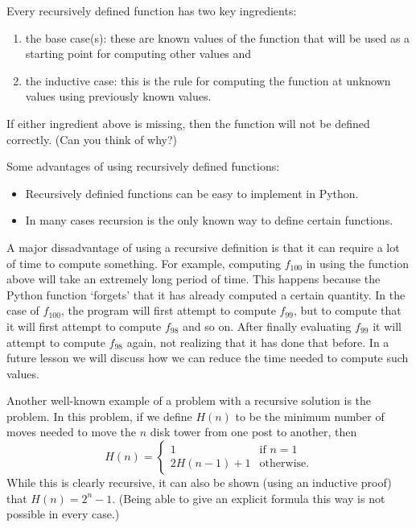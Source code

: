 \documentclass{ximera}
\begin{document}
Every recursively defined function has two key ingredients:

	\begin{enumerate}
	\item the base case(s): these are known values of the function that will be used as a starting point for computing other values and 
	\item the inductive case: this is the rule for computing the function at unknown values using previously known values.
	\end{enumerate}

If either ingredient above is missing, then the function will not be defined correctly. (Can you think of why?)

Some advantages of using recursively defined functions:

	\begin{itemize}
		\item Recursively definied functions can be easy to implement in Python.
		\item In many cases recursion is the only known way to define certain functions.
	\end{itemize}

A major dissadvantage of using a recursive definition is that it can require a lot of time to compute something. For example, computing $f_{100}$ in using the function above will take an extremely long period of time. This happens because the Python function `forgets' that it has already computed a certain quantity. In the case of $f_{100}$, the program will first attempt to compute $f_{99}$, but to compute that it will first attempt to compute $f_{98}$ and so on. After finally evaluating $f_{99}$ it will attempt to compute $f_{98}$ again, not realizing that it has done that before. In a future lesson we will discuss how we can reduce the time needed to compute such values.

Another well-known example of a problem with a recursive solution is the  problem. In this problem, if we define $H(n)$ to be the minimum number of moves needed to move the $n$ disk tower from one post to another, then $$H(n) = \begin{cases}1 & \text{if $n=1$}\\ 2H(n-1) + 1 & \text{otherwise.}\end{cases}$$ While this is clearly recursive, it can also be shown (using an inductive proof) that $H(n)=2^n-1$. (Being able to give an explicit formula this way is not possible in every case.)
\end{document}
